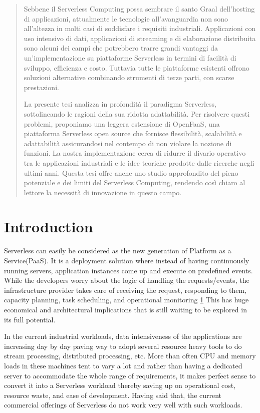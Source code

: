 \documentclass[12pt,titlepage]{article}
\begin{document}
\begin{abstract}
Sebbene il Serverless Computing possa sembrare il santo Graal dell’hosting di applicazioni, attualmente le tecnologie all’avanguardia non sono all’altezza in molti casi di soddisfare i requisiti industriali. Applicazioni con uso intensivo di dati, applicazioni di streaming e di elaborazione distribuita sono alcuni dei campi che potrebbero trarre grandi vantaggi da un’implementazione su piattaforme Serverless in termini di facilità di sviluppo, efficienza e costo. Tuttavia tutte le piattaforme esistenti offrono soluzioni alternative combinando strumenti di terze parti, con scarse prestazioni.

La presente tesi analizza in profondità il paradigma Serverless, sottolineando le ragioni della sua ridotta adattabilità. Per risolvere questi problemi, proponiamo una leggera estensione di OpenFaaS, una piattaforma Serverless open source che fornisce flessibilità, scalabilità e adattabilità assicurandosi nel contempo di non violare la nozione di funzioni. La nostra implementazione cerca di ridurre il divario operativo tra le applicazioni industriali e le idee teoriche prodotte dalle ricerche negli ultimi anni. Questa tesi offre anche uno studio approfondito del pieno potenziale e dei limiti del Serverless Computing, rendendo così chiaro al lettore la necessità di innovazione in questo campo.

\end{abstract}



\setcounter{tocdepth}{5}
\tableofcontents

\listoffigures

\section{Introduction}
\label{sec:org6adce5f}

Serverless can easily be considered as the new generation of Platform as a  
Service(PaaS). It is a deployment solution where instead of having continuously
running servers, application instances come up and execute on predefined events.
While the developers worry about
the logic of handling the requests/events, the infrastructure provider takes
care of receiving the request, responding to them, capacity planning, task
scheduling, and operational monitoring \hyperref[ref:1]{1}
This has huge economical and architectural implications that is
still waiting to be explored in its full potential. 

In the current industrial workloads, data intensiveness of the applications are increasing
day by day paving way to adopt several resource heavy tools to do stream
processing, distributed processing, etc. More than often CPU and memory loads in
these machines tent to vary a lot and rather than having a dedicated server to accommodate the whole range
of requirements, it makes perfect sense to convert it into a Serverless workload
thereby saving up on operational cost, resource waste, and ease of development.
Having said that, the current commercial offerings of Serverless do not work
very well with such workloads.
\end{document}
